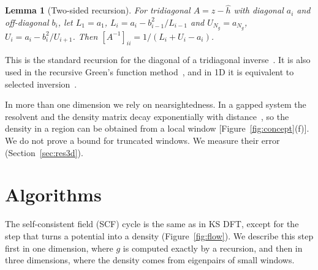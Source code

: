 \documentclass[aps,prb,twocolumn,superscriptaddress,floatfix,longbibliography]{revtex4-2}
\newtheorem{lemma}{Lemma}
\theoremstyle{remark}
\begin{document}
\begin{lemma}[Two-sided recursion]\label{lem:recursion}
For tridiagonal $A=z-\hat h$ with diagonal $a_i$ and off-diagonal $b_i$, let $L_1=a_1$, $L_i=a_i-b_{i-1}^2/L_{i-1}$ and
$U_{N_g}=a_{N_g}$, $U_i=a_i-b_i^2/U_{i+1}$. Then $[A^{-1}]_{ii}=1/(L_i+U_i-a_i)$.
\end{lemma}

This is the standard recursion for the diagonal of a tridiagonal inverse~\cite{Meurant1992}. It is also used in the recursive
Green's function method~\cite{Lake1997}, and in 1D it is equivalent to selected inversion~\cite{PEXSI2013}.

In more than one dimension we rely on nearsightedness. In a gapped system the resolvent and the density matrix decay
exponentially with distance~\cite{CombesThomas1973,Kohn1996,ProdanKohn2005}, so the density in a region can be obtained from
a local window [Figure~\ref{fig:concept}(f)]. We do not prove a bound for truncated windows. We measure their error
(Section~\ref{sec:res3d}).

\section{Algorithms}\label{sec:algorithms}

The self-consistent field (SCF) cycle is the same as in KS DFT, except for the step that turns a potential into a
density (Figure~\ref{fig:flow}). We describe this step first in one dimension, where $g$ is computed exactly by a recursion,
and then in three dimensions, where the density comes from eigenpairs of small windows.
\end{document}
